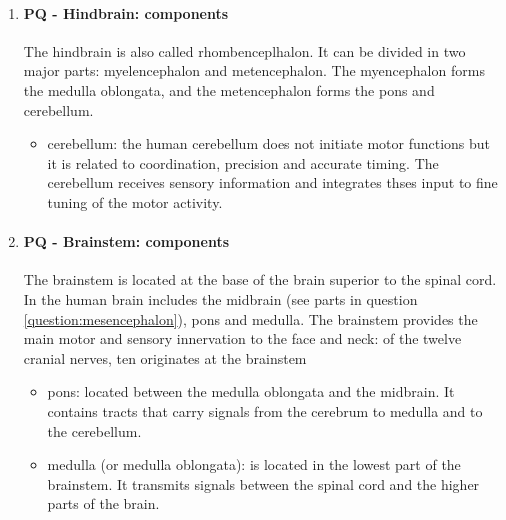 \documentclass[12pt,article,oneside,a4paper]{memoir}
\begin{document}
\begin{enumerate}
\item \paragraph{PQ - Hindbrain: components}
The hindbrain is also called rhombenceplhalon. It can be divided in two major parts: myelencephalon and metencephalon. The myencephalon forms the medulla oblongata, and the metencephalon forms the pons and cerebellum.
\begin{itemize}
\item cerebellum: the human cerebellum does not initiate motor functions but it is related to coordination, precision and accurate timing. The cerebellum receives sensory information and integrates thses input to fine tuning of the motor activity.
\end{itemize}

\item \paragraph{PQ - Brainstem: components}
The brainstem is located at the base of the brain superior to the spinal cord. In the human brain includes the midbrain (see parts in question \ref{question:mesencephalon}), pons and medulla. The brainstem provides the main motor and sensory innervation to the face and neck: of the twelve cranial nerves, ten originates at the brainstem
\begin{itemize}
\item pons: located between the medulla oblongata and the midbrain. It contains tracts that carry signals from the cerebrum to medulla and to the cerebellum.
\item medulla (or medulla oblongata): is located in the lowest part of the brainstem. It transmits signals between the spinal cord and the higher parts of the brain.
\end{itemize}
\end{enumerate}


\end{document}
